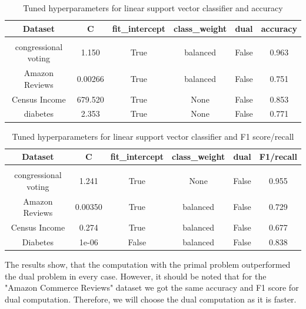 \documentclass[a4paper,10pt]{article}
\begin{document}
\begin{table}[h!]
    \centering
    \begin{tabular}{|c|c|c|c|c|c|}
    \hline
    Dataset & \textsf{C} & \textsf{fit\_intercept} &  \textsf{class\_weight} & \textsf{dual} & accuracy \\
    \hline
    \multicolumn{6}{c}{\vspace{-0.4cm}} \\ %
    \hline
    congressional voting & 1.150 & True & balanced & False & 0.963 \\%
    \hline
    Amazon Reviews & 0.00266 & True & balanced & False & 0.751 \\%
    \hline
    Census Income & 679.520 & True & None & False & 0.853 \\%
    \hline
    diabetes & 2.353 & True & None & False  & 0.771 \\%
    \hline
    \end{tabular}
    \caption{Tuned hyperparameters for linear support vector classifier and accuracy} 
    \label{table:tu_hyp_svc_ac}
    \end{table}

\begin{table}[h!]
    \centering
    \begin{tabular}{|c|c|c|c|c|c|}
    \hline
    Dataset & \textsf{C} & \textsf{fit\_intercept} &  \textsf{class\_weight} & \textsf{dual} & F1/recall \\
    \hline
    \multicolumn{6}{c}{\vspace{-0.4cm}} \\ %
    \hline
    congressional voting & 1.241 & True & None & False & 0.955 \\%
    \hline
    Amazon Reviews & 0.00350 & True & balanced & False &  0.729 \\%
    \hline
    Census Income & 0.274 & True & balanced & False & 0.677 \\%
    \hline
    Diabetes & 1e-06 & False & balanced & False  & 0.838 \\%
    \hline
    \end{tabular}
    \caption{Tuned hyperparameters for linear support vector classifier and F1 score/recall} 
    \label{table:tu_hyp_svc_f1}
    \end{table}
    
The results show, that the computation with the primal problem outperformed the dual problem in every case. However, it should be noted that for the "Amazon Commerce Reviews" dataset we got the same accuracy and F1 score for dual computation. Therefore, we will choose the dual computation as it is faster.
\end{document}
